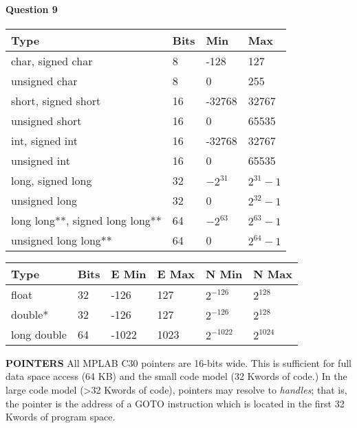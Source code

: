 \documentclass[10pt]{article}
\begin{document}
\paragraph{Question 9}\vspace{0.2cm}
\begin{center}
\begin{tabular}{|l|l|l|l|}
\hline
{\bfseries Type} & {\bfseries Bits} & {\bfseries Min} & {\bfseries Max} \\
\hline\hline
char, signed char 			&		8 	&	-128 		&	127\\\hline
unsigned char 				&		8 	&	0 			&	255\\\hline
short, signed short 		&		16 	&	-32768 		&	32767\\\hline
unsigned short 				&		16 	&	0			& 	65535\\\hline
int, signed int 			&		16 	&	-32768 		&	32767\\\hline
unsigned int 				&		16 	&	0 			&	65535\\\hline
long, signed long 			&		32 	&	$-2^{31}$	&	$2^{31} - 1$\\\hline
unsigned long 				&		32 	&	0 			&	$2^{32} - 1$\\\hline
long long**, signed long long** &	64 	&	$-2^{63}$ 	&	$2^{63} - 1$\\\hline
unsigned long long** 			&	64 	&	0 			&	$2^{64} - 1$\\\hline
\end{tabular}

\begin{tabular}{|l|l|l|l|l|l|}
\hline
{\bfseries Type} 		&	{\bfseries Bits} &	{\bfseries E Min} 	&	{\bfseries E Max} 	&	{\bfseries N Min} 	&	{\bfseries N Max}\\\hline\hline
float 		&	32 	&	-126 	&	127 	&	$2^{-126}$	&$2^{128}$\\\hline
double* 	&	32 	&	-126 	&	127 	&	$2^{-126}$ 	&$2^{128}$\\\hline
long double &	64 	&	-1022 	&	1023 	&	$2^{-1022}$	&$2^{1024}$\\\hline
\end{tabular}
\end{center}

{\bfseries POINTERS}
All MPLAB C30 pointers are 16-bits wide. This is sufficient for full data space access 
(64 KB) and the small code model (32 Kwords of code.) In the large code model 
(>32 Kwords of code), pointers may resolve to \emph{handles}; that is, the pointer is the 
address of a GOTO instruction which is located in the first 32 Kwords of program space.
\end{document}
